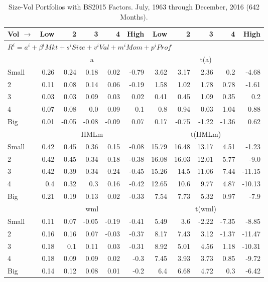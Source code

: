 
\begin{table}[!ht]
\centering
\caption{Size-Vol Portfolios with BS2015 Factors. \footnotesize{July, 1963 through December, 2016 (642 Months).}}
\begin{tabular}{lrrrrrrrrrr}
  \toprule
  Vol $\rightarrow$ & Low & 2 & 3 & 4 & High & Low & 2 & 3 & 4 & High \\ 
  \toprule
  \multicolumn{9}{l}{$R^i=a^i+\beta^iMkt+s^iSize+v^iVal+m^iMom+p^iProf$} \\

  

      & \multicolumn{5}{c}{a} & \multicolumn{5}{c}{t(a)} \\
    \cmidrule(r){2-6} \cmidrule(r){7-11}
      Small  & 0.26  & 0.24  & 0.18  & 0.02  & -0.79   & 3.62  & 3.17  & 2.36  & 0.2  & -4.68  \\
          2  & 0.11  & 0.08  & 0.14  & 0.06  & -0.19   & 1.58  & 1.02  & 1.78  & 0.78  & -1.61  \\
          3  & 0.03  & 0.03  & 0.09  & 0.03  & 0.02   & 0.41  & 0.45  & 1.09  & 0.35  & 0.2  \\
          4  & 0.07  & 0.08  & 0.0  & 0.09  & 0.1   & 0.8  & 0.94  & 0.03  & 1.04  & 0.88  \\
      Big    & 0.01  & -0.05  & -0.08  & -0.09  & 0.07   & 0.17  & -0.75  & -1.22  & -1.36  & 0.62  \\


      & \multicolumn{5}{c}{HMLm} & \multicolumn{5}{c}{t(HMLm)} \\
    \cmidrule(r){2-6} \cmidrule(r){7-11}
      Small  & 0.42  & 0.45  & 0.36  & 0.15  & -0.08   & 15.79  & 16.48  & 13.17  & 4.51  & -1.23  \\
          2  & 0.42  & 0.45  & 0.34  & 0.18  & -0.38   & 16.08  & 16.03  & 12.01  & 5.77  & -9.0  \\
          3  & 0.42  & 0.39  & 0.34  & 0.24  & -0.45   & 15.26  & 14.5  & 11.06  & 7.44  & -11.15  \\
          4  & 0.4  & 0.32  & 0.3  & 0.16  & -0.42   & 12.65  & 10.6  & 9.77  & 4.87  & -10.13  \\
      Big    & 0.21  & 0.19  & 0.13  & 0.02  & -0.33   & 7.54  & 7.73  & 5.32  & 0.97  & -7.9  \\

  

      & \multicolumn{5}{c}{wml} & \multicolumn{5}{c}{t(wml)} \\
    \cmidrule(r){2-6} \cmidrule(r){7-11}
      Small  & 0.11  & 0.07  & -0.05  & -0.19  & -0.41   & 5.49  & 3.6  & -2.22  & -7.35  & -8.85  \\
          2  & 0.16  & 0.16  & 0.07  & -0.03  & -0.37   & 8.17  & 7.43  & 3.12  & -1.37  & -11.47  \\
          3  & 0.18  & 0.1  & 0.11  & 0.03  & -0.31   & 8.92  & 5.01  & 4.56  & 1.18  & -10.31  \\
          4  & 0.18  & 0.09  & 0.09  & 0.02  & -0.3   & 7.45  & 3.93  & 3.73  & 0.85  & -9.72  \\
      Big    & 0.14  & 0.12  & 0.08  & 0.01  & -0.2   & 6.4  & 6.68  & 4.72  & 0.3  & -6.42  \\


\end{tabular}
\end{table}

